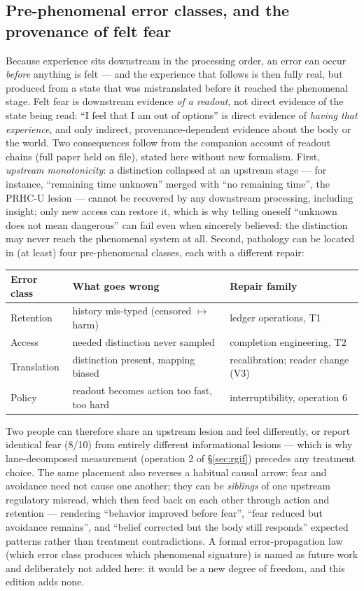 \documentclass[9pt,twocolumn]{article}
\begin{document}
\subsection{Pre-phenomenal error classes, and the provenance of felt fear}
\label{sec:preerror}
Because experience sits downstream in the processing order, an error can occur \emph{before} anything is felt --- and the experience that follows is then fully real, but produced from a state that was mistranslated before it reached the phenomenal stage. Felt fear is downstream evidence \emph{of a readout}, not direct evidence of the state being read: ``I feel that I am out of options'' is direct evidence of \emph{having that experience}, and only indirect, provenance-dependent evidence about the body or the world. Two consequences follow from the companion account of readout chains \cite{lahtee2026rc} (full paper held on file), stated here without new formalism. First, \emph{upstream monotonicity}: a distinction collapsed at an upstream stage --- for instance, ``remaining time unknown'' merged with ``no remaining time'', the PRHC-U lesion --- cannot be recovered by any downstream processing, including insight; only new access can restore it, which is why telling oneself ``unknown does not mean dangerous'' can fail even when sincerely believed: the distinction may never reach the phenomenal system at all. Second, pathology can be located in (at least) four pre-phenomenal classes, each with a different repair:
\begin{center}
\footnotesize
\begin{tabularx}{\columnwidth}{@{}p{}Xp{}@{}}
\toprule
\textbf{Error class} & \textbf{What goes wrong} & \textbf{Repair family} \\
\midrule
Retention & history mis-typed (censored $\mapsto$ harm) & ledger operations, T1 \\
Access & needed distinction never sampled & completion engineering, T2 \\
Translation & distinction present, mapping biased & recalibration; reader change (V3) \\
Policy & readout becomes action too fast, too hard & interruptibility, operation 6 \\
\bottomrule
\end{tabularx}
\end{center}
Two people can therefore share an upstream lesion and feel differently, or report identical fear (8/10) from entirely different informational lesions --- which is why lane-decomposed measurement (operation 2 of \S\ref{sec:rgif}) precedes any treatment choice. The same placement also reverses a habitual causal arrow: fear and avoidance need not cause one another; they can be \emph{siblings} of one upstream regulatory misread, which then feed back on each other through action and retention --- rendering ``behavior improved before fear'', ``fear reduced but avoidance remains'', and ``belief corrected but the body still responds'' expected patterns rather than treatment contradictions. A formal error-propagation law (which error class produces which phenomenal signature) is named as future work and deliberately not added here: it would be a new degree of freedom, and this edition adds none.
\end{document}
